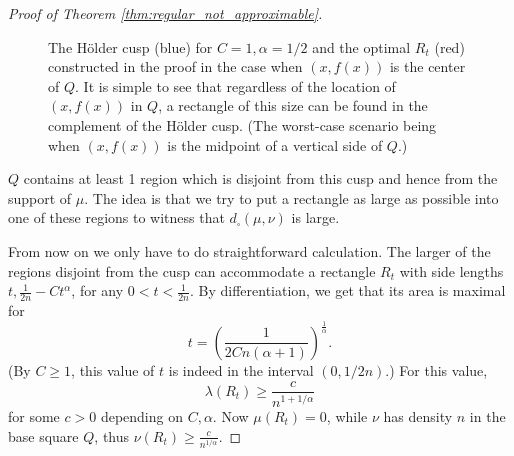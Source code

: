 \documentclass{article}
\theoremstyle{definition}
\begin{document}
\begin{proof}[Proof of Theorem \ref{thm:regular_not_approximable}]
\begin{figure}[htb]
\caption{The Hölder cusp (blue) for $C=1, \alpha=1/2$ and the optimal $R_t$ (red) constructed in the proof in the case when $(x, f(x))$ is the center of $Q$. It is simple to see that regardless of the location of $(x, f(x))$ in $Q$, a rectangle of this size can be found in the complement of the Hölder cusp. (The worst-case scenario being when $(x, f(x))$ is the midpoint of a vertical side of $Q$.)} \label{fig:holder_cusp}
\end{figure}

$Q$ contains at least 1 region which is disjoint from this cusp and hence from the support of $\mu$. The idea is that we try to put a rectangle as large as possible into one of these regions to witness that $d_\square(\mu, \nu)$ is large.

    From now on we only have to do straightforward calculation. The larger of the regions disjoint from the cusp can accommodate a rectangle $R_t$ with side lengths $t, \frac{1}{2n}-Ct^{\alpha}$, for any $0<t<\frac{1}{2n}$. By differentiation, we get that its area is maximal for
    $$t=\left(\frac{1}{2Cn(\alpha+1)}\right)^{\frac{1}{\alpha}}.$$
    (By $C\geq 1$, this value of $t$ is indeed in the interval $(0, 1/2n)$.) For this value, 
    $$\lambda(R_t)\geq \frac{c}{n^{1+1/\alpha}}$$ 
    for some $c>0$ depending on $C, \alpha$. Now $\mu(R_t)=0$, while $\nu$ has density $n$ in the base square $Q$, thus $\nu(R_t)\geq \frac{c}{n^{1/\alpha}}$.


\end{proof}
\end{document}
